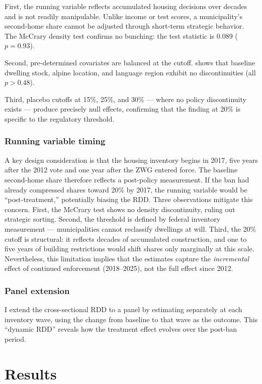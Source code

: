 \documentclass[12pt]{article}
\begin{document}
First, the running variable reflects accumulated housing decisions over decades and is not readily manipulable. Unlike income or test scores, a municipality's second-home share cannot be adjusted through short-term strategic behavior. The McCrary density test confirms no bunching: the test statistic is 0.089 ($p = 0.93$).

Second, pre-determined covariates are balanced at the cutoff.  shows that baseline dwelling stock, alpine location, and language region exhibit no discontinuities (all $p > 0.48$).

Third, placebo cutoffs at 15\%, 25\%, and 30\% --- where no policy discontinuity exists --- produce precisely null effects, confirming that the finding at 20\% is specific to the regulatory threshold.

\subsubsection*{Running variable timing} A key design consideration is that the housing inventory begins in 2017, five years after the 2012 vote and one year after the ZWG entered force. The baseline second-home share therefore reflects a post-policy measurement. If the ban had already compressed shares toward 20\% by 2017, the running variable would be ``post-treatment,'' potentially biasing the RDD. Three observations mitigate this concern. First, the McCrary test shows no density discontinuity, ruling out strategic sorting. Second, the threshold is defined by federal inventory measurement --- municipalities cannot reclassify dwellings at will. Third, the 20\% cutoff is structural: it reflects decades of accumulated construction, and one to five years of building restrictions would shift shares only marginally at this scale. Nevertheless, this limitation implies that the estimates capture the \textit{incremental} effect of continued enforcement (2018--2025), not the full effect since 2012.

\subsubsection*{Panel extension} I extend the cross-sectional RDD to a panel by estimating  separately at each inventory wave, using the change from baseline to that wave as the outcome. This ``dynamic RDD'' reveals how the treatment effect evolves over the post-ban period.

\section{Results}
\end{document}
